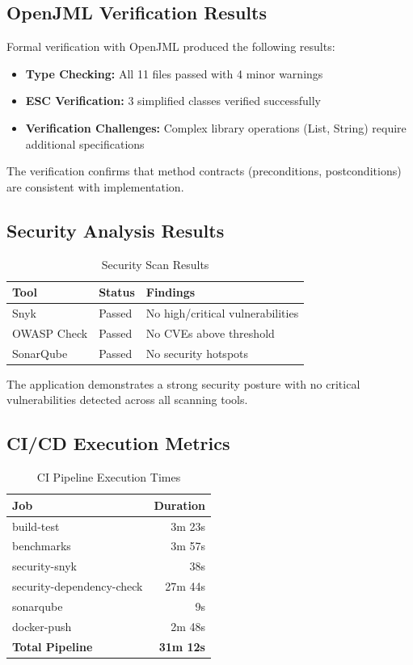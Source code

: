 \documentclass[sigconf]{acmart}
\begin{document}
\subsection{OpenJML Verification Results}

Formal verification with OpenJML produced the following results:
\begin{itemize}
    \item \textbf{Type Checking:} All 11 files passed with 4 minor warnings
    \item \textbf{ESC Verification:} 3 simplified classes verified successfully
    \item \textbf{Verification Challenges:} Complex library operations (List, String) require additional specifications
\end{itemize}

The verification confirms that method contracts (preconditions, postconditions) are consistent with implementation.

\subsection{Security Analysis Results}

\begin{table}[h]
\caption{Security Scan Results}
\begin{tabular}{lll}
\toprule
\textbf{Tool} & \textbf{Status} & \textbf{Findings} \\
\midrule
Snyk & Passed & No high/critical vulnerabilities \\
OWASP Check & Passed & No CVEs above threshold \\
SonarQube & Passed & No security hotspots \\
\bottomrule
\end{tabular}
\end{table}

The application demonstrates a strong security posture with no critical vulnerabilities detected across all scanning tools.

\subsection{CI/CD Execution Metrics}

\begin{table}[h]
\caption{CI Pipeline Execution Times}
\begin{tabular}{lr}
\toprule
\textbf{Job} & \textbf{Duration} \\
\midrule
build-test & 3m 23s \\
benchmarks & 3m 57s \\
security-snyk & 38s \\
security-dependency-check & 27m 44s \\
sonarqube & 9s \\
docker-push & 2m 48s \\
\midrule
\textbf{Total Pipeline} & \textbf{31m 12s} \\
\bottomrule
\end{tabular}
\end{table}
\end{document}

